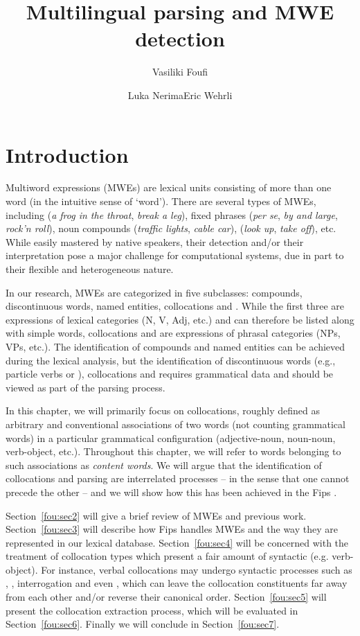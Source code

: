 \documentclass[output=paper]{langsci/langscibook}
\title{Multilingual parsing and {M}{W}{E} detection}
\author{Vasiliki Foufi\affiliation{University of Geneva}\and Luka Nerima\affiliation{University of Geneva}\lastand Eric Wehrli\affiliation{University of Geneva}}
\begin{document}
\maketitle

\section{Introduction}

Multiword expressions (MWEs) are lexical units consisting of more than one word (in the intuitive sense of `word'). There are several types of MWEs, including  (\textit{a frog in the throat}, \textit{break a leg}), fixed phrases (\textit{per se}, \textit{by and large}, \textit{rock'n roll}), noun compounds (\textit{traffic lights}, \textit{cable car}),  (\textit{look up}, \textit{take off}), etc. While easily mastered by native speakers, their detection and/or their interpretation pose a major challenge for computational systems, due in part to their flexible and heterogeneous nature. 

In our research, MWEs are categorized in five subclasses: compounds, discontinuous words, named entities, collocations and . While the first three are expressions of lexical categories (N, V, Adj, etc.) and can therefore be listed along with simple words, collocations and  are expressions of phrasal categories (NPs, VPs, etc.). The identification of compounds and named entities can be achieved during the lexical analysis, but the identification of discontinuous words (e.g., particle verbs or ), collocations and  requires grammatical data and should be viewed as part of the parsing process. 

In this chapter, we will primarily focus on collocations, roughly defined as arbitrary and conventional associations of two words (not counting grammatical words) in a particular grammatical configuration (adjective-noun, noun-noun, verb-object, etc.). Throughout this chapter, we will refer to words belonging to such associations as \emph{content words}. We will
argue that the identification of collocations and parsing are interrelated processes -- in the sense that one cannot precede the other --  and we will show how this has been achieved in the Fips  \citep{wehrli07,wn15}.%

Section~\ref{fou:sec2} will give a brief review of MWEs and previous work. Section~\ref{fou:sec3} will describe how Fips handles MWEs and the way they are represented in our lexical database. Section~\ref{fou:sec4} will be concerned with the treatment of collocation types which present a fair amount of syntactic  (e.g. verb-object). For instance, verbal collocations may undergo syntactic processes such as , , interrogation and even , which can leave the collocation constituents far away from each other and/or reverse their canonical order. Section~\ref{fou:sec5} will present the collocation extraction process, which will be evaluated in Section~\ref{fou:sec6}. Finally we will conclude in Section~\ref{fou:sec7}.
\end{document}
